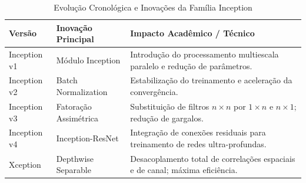 \begin{table}[ht]
\centering
\caption{Evolução Cronológica e Inovações da Família Inception}
\label{tab:inception_evolution}
\begin{tabular}{@{}ll p{8cm}@{}}
\toprule
\textbf{Versão} & \textbf{Inovação Principal} & \textbf{Impacto Acadêmico / Técnico} \\ \midrule
Inception v1 & Módulo Inception & Introdução do processamento multiescala paralelo e redução de parâmetros. \\
Inception v2 & Batch Normalization & Estabilização do treinamento e aceleração da convergência. \\
Inception v3 & Fatoração Assimétrica & Substituição de filtros $n \times n$ por $1 \times n$ e $n \times 1$; redução de gargalos. \\
Inception v4 & Inception-ResNet & Integração de conexões residuais para treinamento de redes ultra-profundas. \\
Xception & Depthwise Separable & Desacoplamento total de correlações espaciais e de canal; máxima eficiência. \\ \bottomrule
\end{tabular}
\end{table}